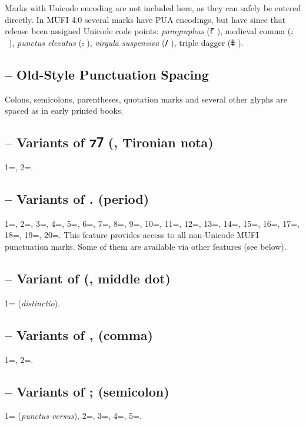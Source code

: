 Marks with Unicode encoding are not included here, as they can safely be entered directly. In MUFI 4.0 several marks
have PUA encodings, but have since that release been assigned Unicode code points: \textit{paragraphus} (⹍
), medieval comma (⹌~), \textit{punctus elevatus} (⹎ ), \textit{virgula suspensiva}
(⹊ ), triple dagger (⹋ ).

\subsection{ -- Old-Style Punctuation Spacing}
Colons, semicolons, parentheses, quotation marks and several other glyphs are spaced as in early printed books.

\subsection{ -- Variants of ⁊⹒
(, Tironian nota)}
1=, 2=.

\subsection{ --
  Variants of . (period)}
1=, 2=, 3=, 4=, 5=, 6=,
7=, 8=, 9=, 10=, 11=, 12=,
13=, 14=, 15=, 16=, 17=,
18=, 19=, 20=. This
feature provides access to all non-Unicode MUFI punctuation marks. Some of them are available via other features (see
below).

\subsection{ -- Variant of {\textperiodcentered} (, middle dot)}
1= (\textit{distinctio}).

\subsection{ --
Variants of , (comma)}
1=, 2=.

\subsection{ --
Variants of ; (semicolon)}
1= (\textit{punctus versus}), 2=, 3=, 4=, 5=.

